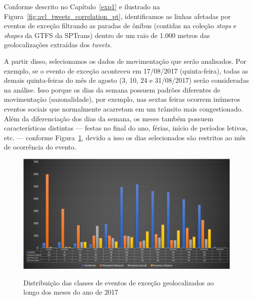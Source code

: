 \documentclass[
	12pt,				%
	oneside,			%
	a4paper,			%
	english,			%
	brazil				%
	]{abntex2ppgsi}
\begin{document}
{{{Conforme descrito no Capítulo~\ref{exp1} e ilustrado na Figura~\ref{fig:avl_tweets_correlation_pt}, identificamos as linhas afetadas por eventos de exceção filtrando as paradas de ônibus (contidas na coleção \textit{stops}  e \textit{shapes} da GTFS da SPTrans) dentro de um raio de 1.000 metros das geolocalizações extraídas dos \textit{tweets}. 

A partir disso, selecionamos os dados de movimentação que serão analisados. Por exemplo, se o evento de exceção aconteceu em 17/08/2017 (quinta-feira), todas as demais quinta-feiras do mês de agosto (3, 10, 24 e 31/08/2017) serão consideradas na análise. Isso porque os dias da semana possuem padrões diferentes de movimentação (sazonalidade), por exemplo, nas sextas feiras ocorrem inúmeros eventos sociais que normalmente acarretam em um trânsito mais congestionado. Além da diferenciação dos dias da semana, os meses também possuem características distintas --- festas no final do ano, férias, início de períodos letivos, etc. --- conforme Figura~\ref{fig:exception_events_classification_distribution}, devido a isso os dias selecionados são restritos ao mês de ocorrência do evento. 

\begin{figure}[!htb]
	\centering
 	  \caption{Distribuição das classes de eventos de exceção geolocalizados ao longo dos meses do ano de 2017}
		\includegraphics[width=1\linewidth]{images/exception_events_classification_distribution_pt.png}
	\label{fig:exception_events_classification_distribution}
\end{figure}

}}}
\end{document}
